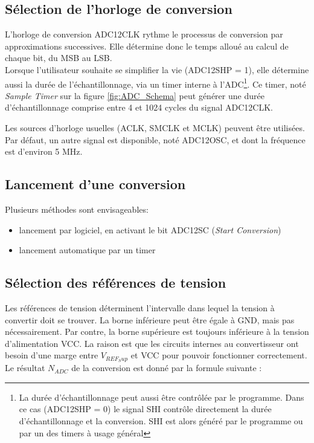 \subsection{Sélection de l'horloge de conversion}
L'horloge de conversion ADC12CLK rythme le processus de conversion par approximations successives. Elle détermine donc le temps alloué au calcul de chaque bit, du MSB au LSB.\\

Lorsque l'utilisateur souhaite se simplifier la vie (ADC12SHP = 1), elle détermine aussi la durée de l'échantillonnage, via un timer interne à l'ADC\footnote{La durée d'échantillonnage peut aussi être contrôlée par le programme. Dans ce cas (ADC12SHP = 0) le signal SHI contrôle directement la durée d'échantillonnage et la conversion. SHI est alors généré par le programme ou par un des timers à usage général}. Ce timer, noté \textit{Sample Timer}  sur la figure \ref{fig:ADC_Schema} peut générer une durée d'échantillonnage comprise entre 4 et 1024 cycles du signal ADC12CLK.

Les sources d'horloge usuelles (ACLK, SMCLK et MCLK) peuvent être utilisées. Par défaut, un autre signal est disponible, noté ADC12OSC, et dont la fréquence est d'environ 5 MHz.

\subsection{Lancement d'une conversion}
Plusieurs méthodes sont envisageables:
\begin{itemize}[label=\textbullet,font=\small]
  \item lancement par logiciel, en activant le bit ADC12SC (\textit{Start Conversion})
  \item lancement automatique par un timer
\end{itemize}

\subsection{Sélection des références de tension}
Les références de tension déterminent l'intervalle dans lequel la tension à convertir doit se trouver. La borne inférieure peut être égale à GND, mais pas nécessairement. Par contre, la borne supérieure est toujours inférieure à la tension d'alimentation VCC. La raison est que les circuits internes au convertisseur ont besoin d'une marge entre $V_{REF_Sup}$ et VCC pour pouvoir fonctionner correctement.
Le résultat $N_{ADC}$ de la conversion est donné par la formule suivante :

